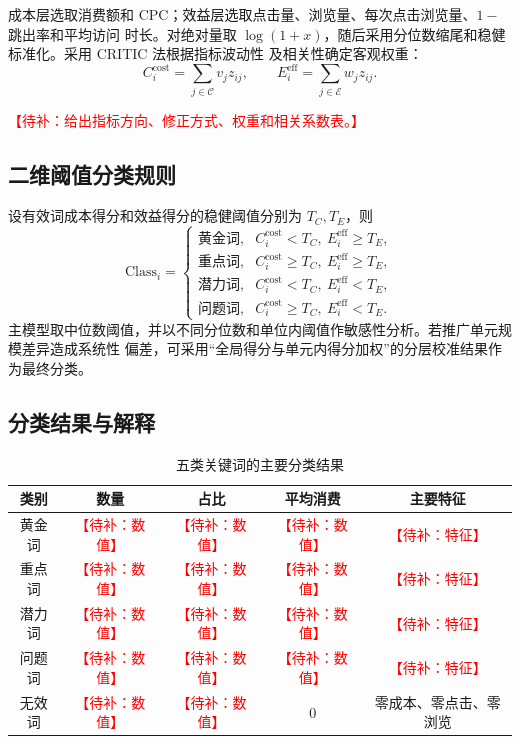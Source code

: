 \documentclass[UTF8,a4paper,zihao=-4]{ctexart}
\newcommand{\placeholder}[1]{\textcolor{red}{【待补：#1】}}
\begin{document}
成本层选取消费额和 CPC；效益层选取点击量、浏览量、每次点击浏览量、$1-$跳出率和平均访问
时长。对绝对量取 $\log(1+x)$，随后采用分位数缩尾和稳健标准化。采用 CRITIC 法根据指标波动性
及相关性确定客观权重\cite{critic}：
\begin{equation}
  C_i^{\mathrm{cost}}=\sum_{j\in\mathcal C}v_jz_{ij},\qquad
  E_i^{\mathrm{eff}}=\sum_{j\in\mathcal E}w_jz_{ij}.
\end{equation}

\placeholder{给出指标方向、修正方式、权重和相关系数表。}

\subsection{二维阈值分类规则}

设有效词成本得分和效益得分的稳健阈值分别为 $T_C,T_E$，则
\begin{equation}
  \mathrm{Class}_i=
  \begin{cases}
    \text{黄金词}, & C_i^{\mathrm{cost}}<T_C,\ E_i^{\mathrm{eff}}\geq T_E,\\
    \text{重点词}, & C_i^{\mathrm{cost}}\geq T_C,\ E_i^{\mathrm{eff}}\geq T_E,\\
    \text{潜力词}, & C_i^{\mathrm{cost}}<T_C,\ E_i^{\mathrm{eff}}<T_E,\\
    \text{问题词}, & C_i^{\mathrm{cost}}\geq T_C,\ E_i^{\mathrm{eff}}<T_E.
  \end{cases}
\end{equation}
主模型取中位数阈值，并以不同分位数和单位内阈值作敏感性分析。若推广单元规模差异造成系统性
偏差，可采用“全局得分与单元内得分加权”的分层校准结果作为最终分类。

\subsection{分类结果与解释}

\begin{table}[H]
  \centering
  \caption{五类关键词的主要分类结果}
  \label{tab:q2-result}
  \begin{tabular}{ccccc}
    \toprule
    类别 & 数量 & 占比 & 平均消费 & 主要特征 \\
    \midrule
    黄金词 & \placeholder{数值} & \placeholder{数值} & \placeholder{数值} & \placeholder{特征} \\
    重点词 & \placeholder{数值} & \placeholder{数值} & \placeholder{数值} & \placeholder{特征} \\
    潜力词 & \placeholder{数值} & \placeholder{数值} & \placeholder{数值} & \placeholder{特征} \\
    问题词 & \placeholder{数值} & \placeholder{数值} & \placeholder{数值} & \placeholder{特征} \\
    无效词 & \placeholder{数值} & \placeholder{数值} & 0 & 零成本、零点击、零浏览 \\
    \bottomrule
  \end{tabular}
\end{table}
\end{document}
